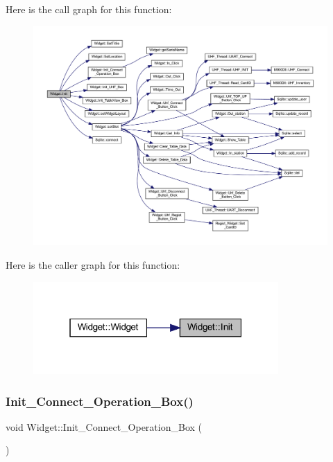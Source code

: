 Here is the call graph for this function\+:
\nopagebreak
\begin{figure}[H]
\begin{center}
\leavevmode
\includegraphics[width=350pt]{class_widget_a3d48db3265c90f9dfa3e2303971690bf_cgraph}
\end{center}
\end{figure}
Here is the caller graph for this function\+:
\nopagebreak
\begin{figure}[H]
\begin{center}
\leavevmode
\includegraphics[width=265pt]{class_widget_a3d48db3265c90f9dfa3e2303971690bf_icgraph}
\end{center}
\end{figure}
\mbox{\label{class_widget_a73ede9961382ea942361e9845fa11aa0}} 
\subsubsection{\texorpdfstring{Init\_Connect\_Operation\_Box()}{Init\_Connect\_Operation\_Box()}}
{\footnotesize\ttfamily void Widget\+::\+Init\+\_\+\+Connect\+\_\+\+Operation\+\_\+\+Box (\begin{DoxyParamCaption}{ }\end{DoxyParamCaption})}

